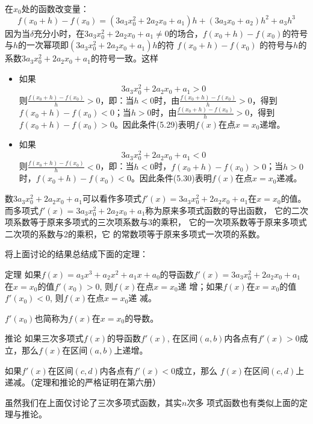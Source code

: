 在$x_0$处的函数改变量：
\[f(x_0+h)-f(x_0)=(3a_3x_0^2+2a_2x_0+a_1)h+(3a_3x_0+
a_2)h^2+a_3h^3\]
因为当$\delta$充分小时，在$3a_3x_0^2+2a_2x_0+a_1\ne 0$的场合，$f(x_0+h)-f(x_0)$的符号与$h$的一次幂项即$(3a_3x_0^2+2a_2x_0+a_1)h$的符
$f(x_0+h)-f(x_0)$
的符号与$h$的系数$3a_3x_0^2+2a_2x_0+a_1$的符号一致。这样
\begin{itemize}
    \item 如果
    \begin{equation}
        3a_3x_0^2+2a_2x_0+a_1>0
    \end{equation}
    则$\frac{f(x_0+h)-f(x_0)}{h}>0$，即：当$h<0$时，由$\frac{f(x_0+h)-f(x_0)}{h}>0$，得到$f(x_0+h)-f(x_0)<0$；当$h>0$时，由$\frac{f(x_0+h)-f(x_0)}{h}>0$，得到$f(x_0+h)-f(x_0)>0$。因此条件(5.29)表明$f(x)$在点$x=x_0$递增。
    \item 如果
    \begin{equation}
        3a_3x_0^2+2a_2x_0+a_1<0
    \end{equation}
    则$\frac{f(x_0+h)-f(x_0)}{h}<0$，即：当$h<0$时，$f(x_0+h)-f(x_0)>0$；当$h>0$时，$f(x_0+h)-f(x_0)<0$。因此条件(5.30)表明$f(x)$在点$x=x_0$递减。
\end{itemize}

数$3a_3x_0^2+2a_2x_0+a_1$可以看作多项式$f'(x)=3a_3x_0^2+2a_2x_0+a_1$在$x=x_0$的值。而多项式$f'(x)=3a_3x_0^2+2a_2x_0+a_1$称为原来多项式函数的导出函数，
    它的二次项系数等于原来多项式的三次项系数与3的乘积，
    它的一次项系数等于原来多项式二次项的系数与2的乘积，它
    的常数项等于原来多项式一次项的系数。

    将上面讨论的结果总结成下面的定理：

\begin{blk}{定理}
    如果$f(x)=a_3x^3+a_2x^2+a_1x+a_0$的导函数$f'(x)=3a_3x_0^2+2a_2x_0+a_1$在$x=x_0$的值$f'(x_0)>0$, 则$f(x)$在点$x=x_0$递
增；如果$f(x)$在$x=x_0$的值$f'(x_0)<0$, 则$f(x)$在点$x=x_0$递
减。
\end{blk}

$f'(x_0)$也简称为$f(x)$在$x=x_0$的导数。

\begin{blk}{推论}
    如果三次多项式$f(x)$的导函数$f'(x)$, 在区间$(a,
b)$内各点有$f'(x)>0$成立，那么$f(x)$在区间$(a,b)$上递增。

如果$f'(x)$在区间$(c,d)$内各点有$f'(x)<0$成立，那么
$f(x)$在区间$(c,d)$上递减。（定理和推论的严格证明在第六册）
\end{blk}
 
虽然我们在上面仅讨论了三次多项式函数，其实$n$次多
项式函数也有类似上面的定理与推论。





